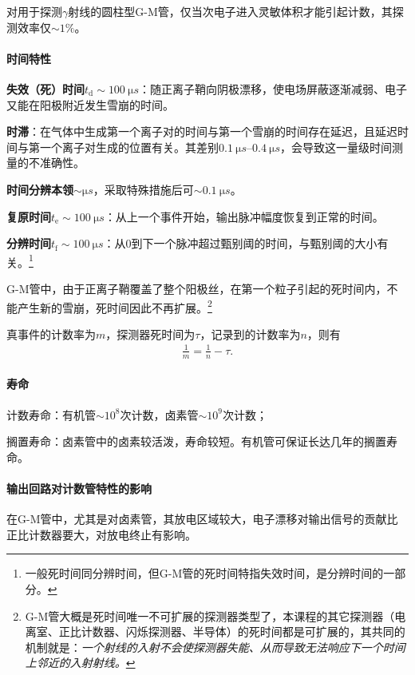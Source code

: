 对用于探测$\gamma$射线的圆柱型G-M管，仅当次电子进入灵敏体积才能引起计数，其探测效率仅$\sim 1\%$。
\paragraph{时间特性}
\begin{compactitem}
	\item \textbf{失效（死）时间}$t_\mathrm d\sim\SI{100}{\micro s}$：随正离子鞘向阴极漂移，使电场屏蔽逐渐减弱、电子又能在阳极附近发生雪崩的时间。
	\item \textbf{时滞}：在气体中生成第一个离子对的时间与第一个雪崩的时间存在延迟，且延迟时间与第一个离子对生成的位置有关。其差别$\SIrange{0.1}{0.4}{\micro s}$，会导致这一量级时间测量的不准确性。
	\item \textbf{时间分辨本领}$\sim\si{\micro s}$，采取特殊措施后可$\sim\SI{0.1}{\micro s}$。
	\item \textbf{复原时间}$t_\mathrm e\sim\SI{100}{\micro s}$：从上一个事件开始，输出脉冲幅度恢复到正常的时间。
	\item \textbf{分辨时间}$t_\mathrm f\sim\SI{100}{\micro s}$：从0到下一个脉冲超过甄别阈的时间，与甄别阈的大小有关。\footnote{一般死时间同分辨时间，但G-M管的死时间特指失效时间，是分辨时间的一部分。}
\end{compactitem}
G-M管中，由于正离子鞘覆盖了整个阳极丝，在第一个粒子引起的死时间内，不能产生新的雪崩，死时间因此不再扩展。\footnote{G-M管大概是死时间唯一不可扩展的探测器类型了，本课程的其它探测器（电离室、正比计数器、闪烁探测器、半导体）的死时间都是可扩展的，其共同的机制就是：\textit{一个射线的入射不会使探测器失能、从而导致无法响应下一个时间上邻近的入射射线。}}

真事件的计数率为$m$，探测器死时间为$\tau$，记录到的计数率为$n$，则有
\begin{align}
	\frac1m=\frac1n-\tau.
\end{align}
\paragraph{寿命}计数寿命：有机管$\sim 10^8$次计数，卤素管$\sim 10^9$次计数；

搁置寿命：卤素管中的卤素较活泼，寿命较短。有机管可保证长达几年的搁置寿命。
\paragraph{输出回路对计数管特性的影响}
在G-M管中，尤其是对卤素管，其放电区域较大，电子漂移对输出信号的贡献比正比计数器要大，对放电终止有影响。

